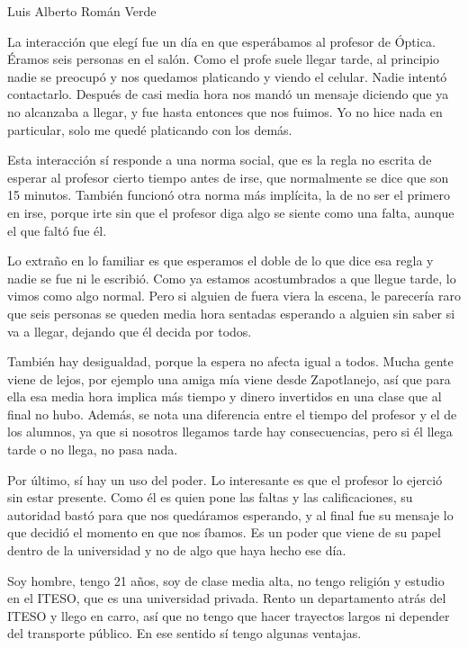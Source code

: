 \documentclass[12pt,letterpaper]{article}
\newcommand{\titulo}[1]{\vspace{6pt}{\LARGE #1}\par\vspace{4pt}}
\begin{document}
Luis Alberto Román Verde

\titulo{Análisis de una interacción social}

La interacción que elegí fue un día en que esperábamos al profesor de Óptica. Éramos seis personas en el salón. Como el profe suele llegar tarde, al principio nadie se preocupó y nos quedamos platicando y viendo el celular. Nadie intentó contactarlo. Después de casi media hora nos mandó un mensaje diciendo que ya no alcanzaba a llegar, y fue hasta entonces que nos fuimos. Yo no hice nada en particular, solo me quedé platicando con los demás.

Esta interacción sí responde a una norma social, que es la regla no escrita de esperar al profesor cierto tiempo antes de irse, que normalmente se dice que son 15 minutos. También funcionó otra norma más implícita, la de no ser el primero en irse, porque irte sin que el profesor diga algo se siente como una falta, aunque el que faltó fue él.

Lo extraño en lo familiar es que esperamos el doble de lo que dice esa regla y nadie se fue ni le escribió. Como ya estamos acostumbrados a que llegue tarde, lo vimos como algo normal. Pero si alguien de fuera viera la escena, le parecería raro que seis personas se queden media hora sentadas esperando a alguien sin saber si va a llegar, dejando que él decida por todos.

También hay desigualdad, porque la espera no afecta igual a todos. Mucha gente viene de lejos, por ejemplo una amiga mía viene desde Zapotlanejo, así que para ella esa media hora implica más tiempo y dinero invertidos en una clase que al final no hubo. Además, se nota una diferencia entre el tiempo del profesor y el de los alumnos, ya que si nosotros llegamos tarde hay consecuencias, pero si él llega tarde o no llega, no pasa nada.

Por último, sí hay un uso del poder. Lo interesante es que el profesor lo ejerció sin estar presente. Como él es quien pone las faltas y las calificaciones, su autoridad bastó para que nos quedáramos esperando, y al final fue su mensaje lo que decidió el momento en que nos íbamos. Es un poder que viene de su papel dentro de la universidad y no de algo que haya hecho ese día.

\newpage
\titulo{Mi ubicación social}

Soy hombre, tengo 21 años, soy de clase media alta, no tengo religión y estudio en el ITESO, que es una universidad privada. Rento un departamento atrás del ITESO y llego en carro, así que no tengo que hacer trayectos largos ni depender del transporte público. En ese sentido sí tengo algunas ventajas.
\end{document}
